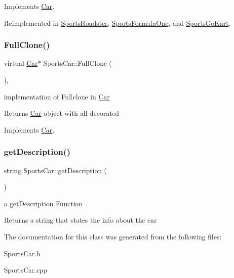 Implements \mbox{\hyperlink{class_car_a27ad98735fd4a3f675234ea806c227da}{Car}}.



Reimplemented in \mbox{\hyperlink{class_sports_roadster_a2f6df8bfdb8a28c413dbd976de77f68a}{Sports\+Roadster}}, \mbox{\hyperlink{class_sports_formula_one_aba368f668094ef50d94c29acd739fcbe}{Sports\+Formula\+One}}, and \mbox{\hyperlink{class_sports_go_kart_abff0ab942e347968f49a3ebf600b19fe}{Sports\+Go\+Kart}}.

\mbox{\label{class_sports_car_a55002e6cf1f09b4a5d0e4c59c938e3a5}} 
\subsubsection{\texorpdfstring{Full\+Clone()}{FullClone()}}
{\footnotesize\ttfamily virtual \mbox{\hyperlink{class_car}{Car}}$\ast$ Sports\+Car\+::\+Full\+Clone (\begin{DoxyParamCaption}{ }\end{DoxyParamCaption})\hspace{0.3cm}{\ttfamily [inline]}, {\ttfamily [virtual]}}

implementation of Fullclone in \mbox{\hyperlink{class_car}{Car}} \begin{DoxyReturn}{Returns}
\mbox{\hyperlink{class_car}{Car}} object with all decorated 
\end{DoxyReturn}


Implements \mbox{\hyperlink{class_car_a6e32b3e8ddaaf2b3873c849e42f6a085}{Car}}.

\mbox{\label{class_sports_car_af530b222b2229bf8f4f95dd2c79bac3a}} 
\subsubsection{\texorpdfstring{get\+Description()}{getDescription()}}
{\footnotesize\ttfamily string Sports\+Car\+::get\+Description (\begin{DoxyParamCaption}{ }\end{DoxyParamCaption})\hspace{0.3cm}{\ttfamily [virtual]}}

a get\+Description Function \begin{DoxyReturn}{Returns}
a string that states the info about the car 
\end{DoxyReturn}


The documentation for this class was generated from the following files\+:\begin{DoxyCompactItemize}
\item 
\mbox{\hyperlink{_sports_car_8h}{Sports\+Car.\+h}}\item 
Sports\+Car.\+cpp\end{DoxyCompactItemize}

